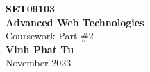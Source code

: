 \begin{titlepage}
    \pagebreak
    \hspace{0pt}
    \vfill
    \begin{center}
    {\fontsize{30}{48}\selectfont \bfseries SET09103}
        \\\vspace{10pt}
        {\fontsize{30}{48}\selectfont \bfseries Advanced Web Technologies}
        \\\vspace{20pt}
        {\LARGE Coursework Part \#2} \\
        \vspace{20pt}
        \textbf{Vinh Phat Tu }
        \vspace{8pt}
        \\ November 2023
    \end{center}
    \vfill
    \hspace{0pt}
    \pagebreak
\end{titlepage}